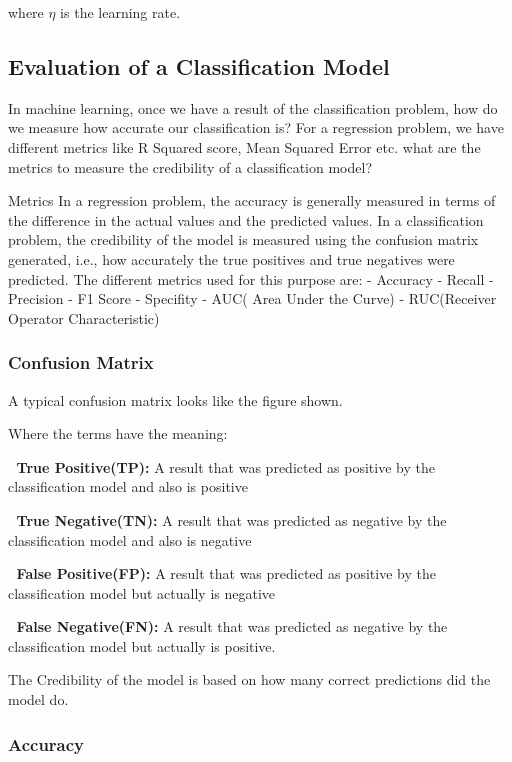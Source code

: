 \documentclass[11pt]{article}
\begin{document}
where \(\eta\) is the learning rate.

    \subsection{Evaluation of a Classification
Model}\label{evaluation-of-a-classification-model}

    In machine learning, once we have a result of the classification
problem, how do we measure how accurate our classification is? For a
regression problem, we have different metrics like R Squared score, Mean
Squared Error etc. what are the metrics to measure the credibility of a
classification model?

Metrics In a regression problem, the accuracy is generally measured in
terms of the difference in the actual values and the predicted values.
In a classification problem, the credibility of the model is measured
using the confusion matrix generated, i.e., how accurately the true
positives and true negatives were predicted. The different metrics used
for this purpose are: - Accuracy - Recall - Precision - F1 Score -
Specifity - AUC( Area Under the Curve) - RUC(Receiver Operator
Characteristic)

    \subsubsection{Confusion Matrix}\label{confusion-matrix}

A typical confusion matrix looks like the figure shown.

Where the terms have the meaning:

 \textbf{True Positive(TP):} A result that was predicted as positive by
the classification model and also is positive

 \textbf{True Negative(TN):} A result that was predicted as negative by
the classification model and also is negative

 \textbf{False Positive(FP):} A result that was predicted as positive
by the classification model but actually is negative

 \textbf{False Negative(FN):} A result that was predicted as negative
by the classification model but actually is positive.

The Credibility of the model is based on how many correct predictions
did the model do.

    \subsubsection{Accuracy}\label{accuracy}
\end{document}
